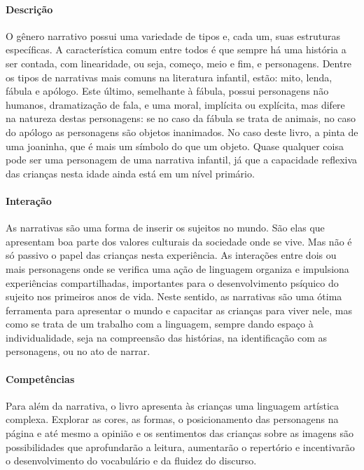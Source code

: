 \documentclass[11pt]{extarticle}
\begin{document}
\paragraph{Descrição} 
O gênero narrativo possui uma variedade de tipos e, cada um, suas estruturas específicas.
A característica comum entre todos é que sempre há uma história a ser contada, com linearidade,
ou seja, começo, meio e fim, e personagens. 
Dentre os tipos de narrativas mais comuns na literatura infantil, estão: mito, lenda, 
fábula e apólogo. Este último, semelhante à fábula, possui personagens não humanos, 
dramatização de fala, e uma moral, implícita ou explícita, mas difere na natureza destas 
personagens: se no caso da fábula se trata de animais, no caso do apólogo as personagens 
são objetos inanimados. No caso deste livro, a pinta de uma joaninha, que é mais um 
símbolo do que um objeto. Quase qualquer coisa pode ser uma personagem de uma narrativa 
infantil, já que a capacidade reflexiva das crianças nesta idade ainda está em um nível primário. 


\paragraph{Interação} 
As narrativas são uma forma de inserir os sujeitos no mundo. 
São elas que apresentam boa parte dos valores culturais da sociedade 
onde se vive. Mas não é só passivo o papel das crianças nesta experiência. 
As interações entre dois ou mais personagens onde se verifica
uma ação de linguagem organiza e impulsiona experiências compartilhadas,
importantes para o desenvolvimento psíquico do sujeito nos primeiros anos de vida.
Neste sentido, as narrativas são uma ótima ferramenta para
apresentar o mundo e capacitar as crianças para viver nele, mas como se
trata de um trabalho com a linguagem, sempre dando espaço à individualidade, 
seja na compreensão das histórias, na identificação com as personagens, ou 
no ato de narrar. 

\paragraph{Competências} 
Para além da narrativa, o livro apresenta às crianças uma linguagem artística complexa.
Explorar as cores, as formas, o posicionamento das personagens 
na página e até mesmo a opinião e os sentimentos das crianças sobre as imagens 
são possibilidades que aprofundarão a leitura, aumentarão o repertório 
e incentivarão o desenvolvimento do vocabulário e da fluidez do discurso. 
\end{document}
